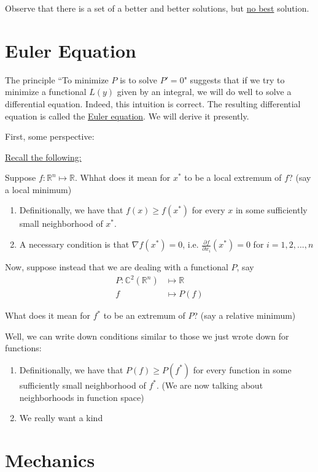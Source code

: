 Observe that there is a set of a better and better solutions, but \underline{no best} solution. 

\section{Euler Equation}
\label{section:euler_equation}

The principle ``To minimize $P$ is to solve $P' = 0 $" suggests that if we try to minimize a functional $L(y)$ given by an integral, we will do well to solve a differential equation. 
Indeed, this intuition is correct. 
The resulting differential equation is called the \underline{Euler equation}. 
We will derive it presently. 

\noindent First, some perspective:

\underline{Recall the following:}

Suppose $f: \mathbb{R}^n \mapsto \mathbb{R}$. Whhat does it mean for $x^*$ to be a local extremum of $f$? (say a local minimum)

\begin{enumerate}
    \item Definitionally, we have that $f(x) \geq f(x^*)$ for every $x$ in some sufficiently small neighborhood of $x^*$. 
    
    \item A necessary condition is that $\nabla f(x^*) = 0$, i.e. $\frac{\partial f}{\partial x_i} (x^*) = 0$ for $i = 1, 2, ... , n$
\end{enumerate}


Now, suppose instead that we are dealing with a functional $P$, say
\begin{align*}
    P: \mathbb{C}^2(\mathbb{R}^n) &\mapsto \mathbb{R}\\
    f &\mapsto P(f)
\end{align*}

What does it mean for $f^*$ to be an extremum of $P$? (say a relative minimum)

Well, we can write down conditions similar to those we just wrote down for functions:

\begin{enumerate}
    \item Definitionally, we have that $P(f) \geq P(f^*)$ for every function in some sufficiently small neighborhood of $f^*$. (We are now talking about neighborhoods in function space) 
    
    \item We really want a kind 
\end{enumerate}

\section{Mechanics}

\